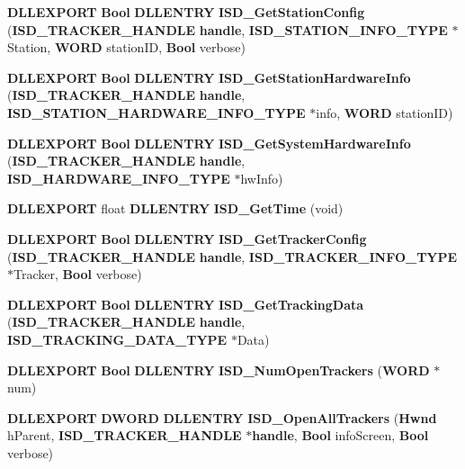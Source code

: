 \begin{DoxyCompactItemize}
\item 
{\bf \-D\-L\-L\-E\-X\-P\-O\-R\-T} {\bf \-Bool} {\bf \-D\-L\-L\-E\-N\-T\-R\-Y} {\bf \-I\-S\-D\-\_\-\-Get\-Station\-Config} ({\bf \-I\-S\-D\-\_\-\-T\-R\-A\-C\-K\-E\-R\-\_\-\-H\-A\-N\-D\-L\-E} {\bf handle}, {\bf \-I\-S\-D\-\_\-\-S\-T\-A\-T\-I\-O\-N\-\_\-\-I\-N\-F\-O\-\_\-\-T\-Y\-P\-E} $\ast$\-Station, {\bf \-W\-O\-R\-D} station\-I\-D, {\bf \-Bool} verbose)
\item 
{\bf \-D\-L\-L\-E\-X\-P\-O\-R\-T} {\bf \-Bool} {\bf \-D\-L\-L\-E\-N\-T\-R\-Y} {\bf \-I\-S\-D\-\_\-\-Get\-Station\-Hardware\-Info} ({\bf \-I\-S\-D\-\_\-\-T\-R\-A\-C\-K\-E\-R\-\_\-\-H\-A\-N\-D\-L\-E} {\bf handle}, {\bf \-I\-S\-D\-\_\-\-S\-T\-A\-T\-I\-O\-N\-\_\-\-H\-A\-R\-D\-W\-A\-R\-E\-\_\-\-I\-N\-F\-O\-\_\-\-T\-Y\-P\-E} $\ast$info, {\bf \-W\-O\-R\-D} station\-I\-D)
\item 
{\bf \-D\-L\-L\-E\-X\-P\-O\-R\-T} {\bf \-Bool} {\bf \-D\-L\-L\-E\-N\-T\-R\-Y} {\bf \-I\-S\-D\-\_\-\-Get\-System\-Hardware\-Info} ({\bf \-I\-S\-D\-\_\-\-T\-R\-A\-C\-K\-E\-R\-\_\-\-H\-A\-N\-D\-L\-E} {\bf handle}, {\bf \-I\-S\-D\-\_\-\-H\-A\-R\-D\-W\-A\-R\-E\-\_\-\-I\-N\-F\-O\-\_\-\-T\-Y\-P\-E} $\ast$hw\-Info)
\item 
{\bf \-D\-L\-L\-E\-X\-P\-O\-R\-T} float {\bf \-D\-L\-L\-E\-N\-T\-R\-Y} {\bf \-I\-S\-D\-\_\-\-Get\-Time} (void)
\item 
{\bf \-D\-L\-L\-E\-X\-P\-O\-R\-T} {\bf \-Bool} {\bf \-D\-L\-L\-E\-N\-T\-R\-Y} {\bf \-I\-S\-D\-\_\-\-Get\-Tracker\-Config} ({\bf \-I\-S\-D\-\_\-\-T\-R\-A\-C\-K\-E\-R\-\_\-\-H\-A\-N\-D\-L\-E} {\bf handle}, {\bf \-I\-S\-D\-\_\-\-T\-R\-A\-C\-K\-E\-R\-\_\-\-I\-N\-F\-O\-\_\-\-T\-Y\-P\-E} $\ast$\-Tracker, {\bf \-Bool} verbose)
\item 
{\bf \-D\-L\-L\-E\-X\-P\-O\-R\-T} {\bf \-Bool} {\bf \-D\-L\-L\-E\-N\-T\-R\-Y} {\bf \-I\-S\-D\-\_\-\-Get\-Tracking\-Data} ({\bf \-I\-S\-D\-\_\-\-T\-R\-A\-C\-K\-E\-R\-\_\-\-H\-A\-N\-D\-L\-E} {\bf handle}, {\bf \-I\-S\-D\-\_\-\-T\-R\-A\-C\-K\-I\-N\-G\-\_\-\-D\-A\-T\-A\-\_\-\-T\-Y\-P\-E} $\ast$\-Data)
\item 
{\bf \-D\-L\-L\-E\-X\-P\-O\-R\-T} {\bf \-Bool} {\bf \-D\-L\-L\-E\-N\-T\-R\-Y} {\bf \-I\-S\-D\-\_\-\-Num\-Open\-Trackers} ({\bf \-W\-O\-R\-D} $\ast$num)
\item 
{\bf \-D\-L\-L\-E\-X\-P\-O\-R\-T} {\bf \-D\-W\-O\-R\-D} {\bf \-D\-L\-L\-E\-N\-T\-R\-Y} {\bf \-I\-S\-D\-\_\-\-Open\-All\-Trackers} ({\bf \-Hwnd} h\-Parent, {\bf \-I\-S\-D\-\_\-\-T\-R\-A\-C\-K\-E\-R\-\_\-\-H\-A\-N\-D\-L\-E} $\ast${\bf handle}, {\bf \-Bool} info\-Screen, {\bf \-Bool} verbose)
\item 

\end{DoxyCompactItemize}
